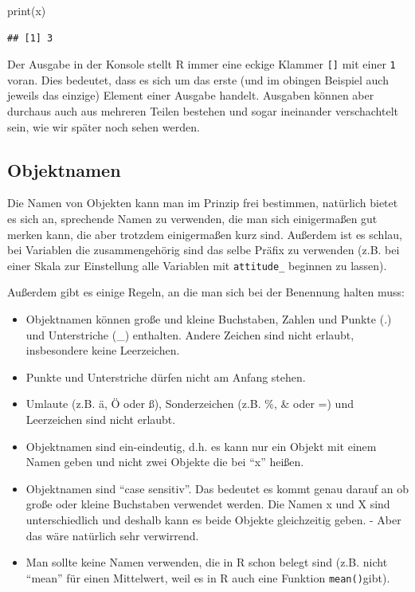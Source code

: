 \documentclass[
]{book}
\newenvironment{Shaded}{\begin{snugshade}}{\end{snugshade}}
\newcommand{\FunctionTok}[1]{\textcolor[rgb]{0.00,0.00,0.00}{#1}}
\newcommand{\NormalTok}[1]{#1}
\begin{document}
\begin{Shaded}
\begin{Highlighting}[]
\FunctionTok{print}\NormalTok{(x)}
\end{Highlighting}
\end{Shaded}

\begin{verbatim}
## [1] 3
\end{verbatim}

Der Ausgabe in der Konsole stellt R immer eine eckige Klammer \texttt{{[}{]}} mit einer \texttt{1} voran. Dies bedeutet, dass es sich um das erste (und im obingen Beispiel auch jeweils das einzige) Element einer Ausgabe handelt. Ausgaben können aber durchaus auch aus mehreren Teilen bestehen und sogar ineinander verschachtelt sein, wie wir später noch sehen werden.

\hypertarget{objektnamen}{%
\subsection{Objektnamen}\label{objektnamen}}

Die Namen von Objekten kann man im Prinzip frei bestimmen, natürlich bietet es sich an, sprechende Namen zu verwenden, die man sich einigermaßen gut merken kann, die aber trotzdem einigermaßen kurz sind. Außerdem ist es schlau, bei Variablen die zusammengehörig sind das selbe Präfix zu verwenden (z.B. bei einer Skala zur Einstellung alle Variablen mit \texttt{attitude\_} beginnen zu lassen).

Außerdem gibt es einige Regeln, an die man sich bei der Benennung halten muss:

\begin{itemize}
\item
  Objektnamen können große und kleine Buchstaben, Zahlen und Punkte (.) und Unterstriche (\_) enthalten. Andere Zeichen sind nicht erlaubt, insbesondere keine Leerzeichen.
\item
  Punkte und Unterstriche dürfen nicht am Anfang stehen.
\item
  Umlaute (z.B. ä, Ö oder ß), Sonderzeichen (z.B. \%, \& oder =) und Leerzeichen sind nicht erlaubt.
\item
  Objektnamen sind ein-eindeutig, d.h. es kann nur ein Objekt mit einem Namen geben und nicht zwei Objekte die bei ``x'' heißen.
\item
  Objektnamen sind ``case sensitiv''. Das bedeutet es kommt genau darauf an ob große oder kleine Buchstaben verwendet werden. Die Namen x und X sind unterschiedlich und deshalb kann es beide Objekte gleichzeitig geben. - Aber das wäre natürlich sehr verwirrend.
\item
  Man sollte keine Namen verwenden, die in R schon belegt sind (z.B. nicht ``mean'' für einen Mittelwert, weil es in R auch eine Funktion \texttt{mean()}gibt).
\end{itemize}
\end{document}
